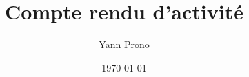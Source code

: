 \documentclass[a4paper,11pt, oneside]{book}
\title{Compte rendu d'activité}
\author{Yann Prono}
\date{\today}
\begin{document}
	\begin{titlepage}
		
	\end{titlepage}

	\newpage

	\newpage\null\thispagestyle{empty}\newpage
	\setcounter{page}{1}

	
	
	

	\clearpage
\end{document}
